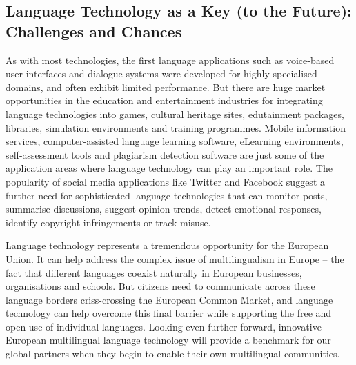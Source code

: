 \documentclass[10pt, plain]{../../metanetpaper}
\begin{document}
\begin{multicols}{2}

\subsection{Language Technology as a Key (to the Future): Challenges and Chances }
\label{sec:lang-techn-as-a-key-to-the-future}


As with most technologies, the first language applications such as voice-based user interfaces and dialogue systems were developed for highly specialised domains, and often exhibit limited performance. But there are huge market opportunities in the education and entertainment industries for integrating language technologies into games, cultural heritage sites, edutainment packages, libraries, simulation environments and training programmes. Mobile information services, computer-assisted language learning software, eLearning environments, self-assessment tools and plagiarism detection software are just some of the application areas where language technology can play an important role. The popularity of social media applications like Twitter and Facebook suggest a further need for sophisticated language technologies that can monitor posts, summarise discussions, suggest opinion trends, detect emotional responses, identify copyright infringements or track misuse.

Language technology represents a tremendous opportunity for the European Union. It can help address the complex issue of multilingualism in Europe – the fact that different languages coexist naturally in European businesses, organisations and schools. But citizens need to communicate across these language borders criss-crossing the European Common Market, and language technology can help overcome this final barrier while supporting the free and open use of individual languages. Looking even further forward, innovative European multilingual language technology will provide a benchmark for our global partners when they begin to enable their own multilingual communities. 


\end{multicols}
\end{document}
